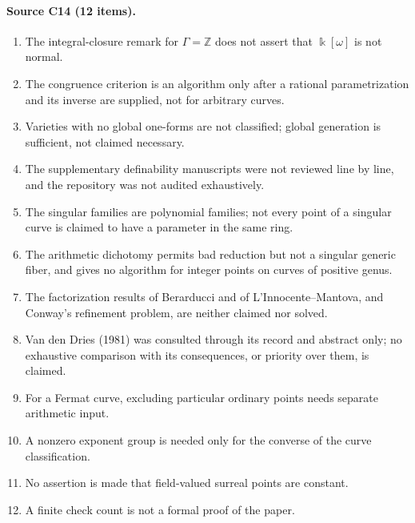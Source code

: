 \documentclass[11pt,oneside]{article}
\numberwithin{equation}{section}
\theoremstyle{definition}
\theoremstyle{remark}
\newcommand{\Z}{\mathbb Z}
\begin{document}
\paragraph{Source C14 (12 items).}
\begin{enumerate}[leftmargin=*,itemsep=1pt]
\item The integral-closure remark for $\Gamma=\Z$ does not assert that $\Bbbk[\omega]$ is
not normal.
\item The congruence criterion is an algorithm only after a rational parametrization and
its inverse are supplied, not for arbitrary curves.
\item Varieties with no global one-forms are not classified; global generation is
sufficient, not claimed necessary.
\item The supplementary definability manuscripts were not reviewed line by line, and the
repository was not audited exhaustively.
\item The singular families are polynomial families; not every point of a singular curve
is claimed to have a parameter in the same ring.
\item The arithmetic dichotomy permits bad reduction but not a singular generic fiber, and
gives no algorithm for integer points on curves of positive genus.
\item The factorization results of Berarducci and of L'Innocente--Mantova, and Conway's
refinement problem, are neither claimed nor solved.
\item Van den Dries (1981) was consulted through its record and abstract only; no
exhaustive comparison with its consequences, or priority over them, is claimed.
\item For a Fermat curve, excluding particular ordinary points needs separate arithmetic
input.
\item A nonzero exponent group is needed only for the converse of the curve classification.
\item No assertion is made that field-valued surreal points are constant.
\item A finite check count is not a formal proof of the paper.
\end{enumerate}
\end{document}
